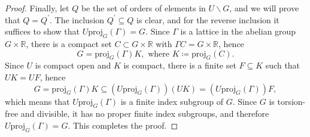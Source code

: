 \documentclass{amsart}
\numberwithin{equation}{subsection}
\theoremstyle{remark}
\begin{document}
\begin{proof}
Finally, let \(Q\) be the set of orders of elements in \(U\backslash G\), and we will prove that \(Q=Q^{\prime}\). The inclusion \(Q^{\prime}\subseteq Q\) is clear, and for the reverse inclusion it suffices to show that \(U\mathrm{proj}_{G}\left(\Gamma\right)=G\). Since \(\Gamma\) is a lattice in the abelian group \(G\times\mathbb{R}\), there is a compact set \(C\subset G\times\mathbb{R}\) with \(\Gamma C=G\times\mathbb{R}\), hence
\[G=\mathrm{proj}_{G}\left(\Gamma\right)K,\text{ where }K\coloneqq\mathrm{proj}_{G}\left(C\right).\]
Since \(U\) is compact open and \(K\) is compact, there is a finite set \(F\subseteq K\) such that \(UK=UF\), hence
\[G=\mathrm{proj}_{G}\left(\Gamma\right)K\subseteq\left(U\mathrm{proj}_{G}\left(\Gamma\right)\right)\left(UK\right)=\left(U\mathrm{proj}_{G}\left(\Gamma\right)\right)F,\]
which means that \(U\mathrm{proj}_{G}\left(\Gamma\right)\) is a finite index subgroup of \(G\). Since \(G\) is torsion-free and divisible, it has no proper finite index subgroups, and therefore \(U\mathrm{proj}_{G}\left(\Gamma\right)=G\). This completes the proof.
\end{proof}

\nocite{*}


\end{document}
